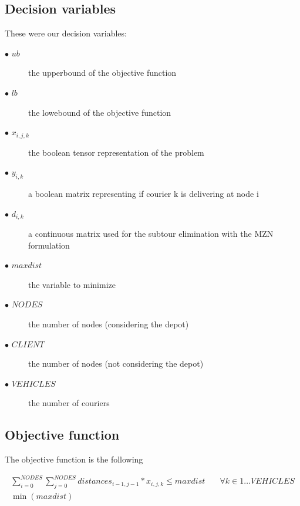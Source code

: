 \documentclass{article}
\begin{document}
\subsection{Decision variables}
These were our decision variables:
\begin{description}
	\item[$\bullet$ $ub$] the upperbound of the objective function
	\item[$\bullet$ $lb$] the lowebound of the objective function
	\item[$\bullet$ $x_{i,j,k}$] the boolean tensor representation of the problem
	\item[$\bullet$ $y_{i,k}$] a boolean matrix representing if courier k is delivering at node i
	\item[$\bullet$ $d_{i,k}$] a continuous matrix used for the subtour elimination with the MZN formulation %
	\item[$\bullet$ $maxdist$] the variable to minimize
	\item[$\bullet$ $NODES$] the number of nodes (considering the depot)
	\item[$\bullet$ $CLIENT$] the number of nodes (not considering the depot)
	\item[$\bullet$ $VEHICLES$] the number of couriers
\end{description}
\subsection{Objective function}
The objective function is the following

\begin{align*}
	\sum_{i = 0}^{NODES}\sum_{j=0}^{NODES} distances_{i-1,j-1} * x_{i,j,k} \le maxdist \quad & \forall k \in 1 \ldots VEHICLES \\
	\min(maxdist)
\end{align*} 
\end{document}
